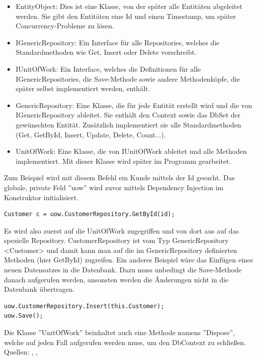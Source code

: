 \begin{itemize}
\item EntityObject: Dies ist eine Klasse, von der später alle Entitäten abgeleitet werden. Sie gibt den Entitäten eine Id und einen Timestamp, um später Concurrency-Probleme zu lösen.
\item IGenericRepository: Ein Interface für alle Repositories, welches die Standardmethoden wie Get, Insert oder Delete vorschreibt.
\item IUnitOfWork: Ein Interface, welches die Definitionen für alle IGenericRepositories, die Save-Methode sowie andere Methodenköpfe, die später selbst implementiert werden, enthält.
\item GenericRepository: Eine Klasse, die für jede Entität erstellt wird und die von IGenericRepository ableitet. Sie enthält den Context sowie das DbSet der gewünschten Entität. Zusätzlich implementiert sie alle Standardmethoden (Get, GetById, Insert, Update, Delete, Count...).
\item UnitOfWork: Eine Klasse, die von IUnitOfWork ableitet und alle Methoden implementiert. Mit dieser Klasse wird später im Programm gearbeitet. 
\end{itemize}
Zum Beispiel wird mit diesem Befehl ein Kunde mittels der Id gesucht. Das globale, private Feld ''uow'' wird zuvor mittels Dependency Injection im Konstruktor initialisiert.
\begin{lstlisting}
Customer c = uow.CustomerRepository.GetById(id);
\end{lstlisting}
Es wird also zuerst auf die UnitOfWork zugegriffen und von dort aus auf das spezielle Repository. CustomerRepository ist vom Typ GenericRepository \textless Customer\textgreater{} und damit kann man auf die im GenericRepository definierten Methoden (hier GetById) zugreifen.
\newline
Ein anderes Beispiel wäre das Einfügen eines neuen Datensatzes in die Datenbank. Dazu muss unbedingt die Save-Methode danach aufgerufen werden, ansonsten werden die Änderungen nicht in die Datenbank übertragen.
\begin{lstlisting}
uow.CustomerRepository.Insert(this.Customer);
uow.Save();
\end{lstlisting}
Die Klasse ''UnitOfWork'' beinhaltet auch eine Methode namens ''Dispose'', welche auf jeden Fall aufgerufen werden muss, um den DbContext zu schließen.
\newline Quellen: \cite{codeproject_unit_2018}, \cite{dofactory_.net_2018}, \cite{c-sharpcorner_unit_2018}
